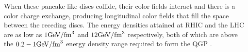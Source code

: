 When these pancake-like discs collide, their color fields interact and there is a color charge exchange, producing longitudinal color fields that fill the space between the receding discs.
%
%
%
%
%
The energy densities attained at RHIC and the LHC are as low as $1 \rm{GeV}/\rm{fm}^3$ \cite{PhysRevC.93.024901} and $12 \rm{GeV}/\rm{fm}^3$ \cite{PhysRevC.94.034903, PhysRevLett.109.152303} respectively, both of which are above the $0.2 - 1 \rm{GeV}/\rm{fm}^3$ energy density range required to form the QGP \cite{Karsch2002, PhysRevD.90.094503}.




